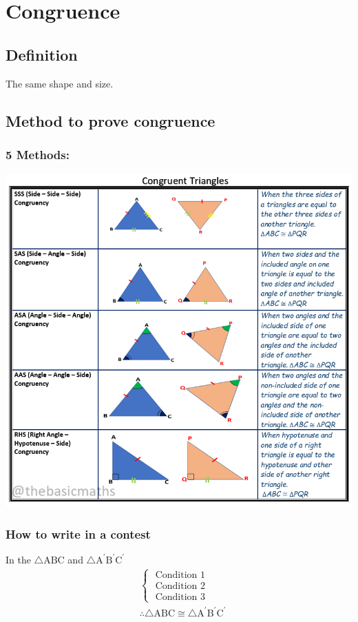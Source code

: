 \documentclass{article}
\begin{document}
\section{Congruence}
\subsection{Definition}
The same shape and size.
\subsection{Method to prove congruence}
\subsubsection{5 Methods:}
\includegraphics[scale=.5]{congruent-triangles.png}
\subsubsection{How to write in a contest}
In the $\triangle \mathrm{ABC}$ and $\triangle \mathrm{A}^{\prime} \mathrm{B}^{\prime} \mathrm{C}^{\prime}$
$$
\begin{aligned}
& \left\{\begin{array}{l}
\text { Condition } 1 \\
\text { Condition } 2 \\
\text { Condition } 3
\end{array}\right. \\
& \therefore \triangle \mathrm{ABC} \cong \triangle \mathrm{A}^{\prime} \mathrm{B}^{\prime} \mathrm{C}^{\prime}
\end{aligned}
$$
\end{document}
